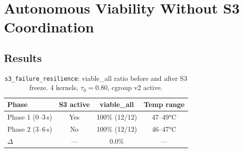 \documentclass[11pt, a4paper]{article}
\begin{document}
%
%
%
%

\section{Autonomous Viability Without S3 Coordination}
\label{sec:auto}

%
%

\subsection{Results}

\begin{table}[h]
\centering
\caption{\texttt{s3\_failure\_resilience}: viable\_all ratio before and after S3 freeze.
         4 kernels, $\tau_0 = 0.80$, cgroup v2 active.}
\label{tab:s3}
\begin{tabular}{lccc}
\toprule
\textbf{Phase} & \textbf{S3 active} & \textbf{viable\_all} & \textbf{Temp range} \\
\midrule
Phase 1 (0--3\,s)  & Yes  & 100\% (12/12) & 47--49°C \\
Phase 2 (3--6\,s)  & No   & 100\% (12/12) & 46--47°C \\
\midrule
$\Delta$            & ---  & 0.0\%         & --- \\
\bottomrule
\end{tabular}
\end{table}
\end{document}
